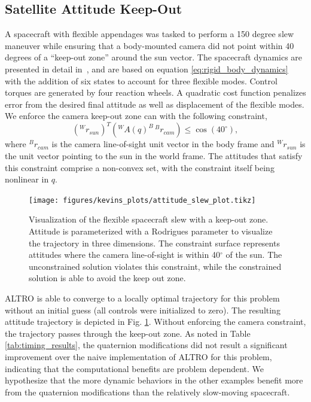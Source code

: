 \documentclass[letterpaper, 10 pt, conference]{ieeeconf}  %
\newcommand{\inframe}[2]{{}^{#1}\!#2}
\newcommand{\toframe}[3]{\inframe{#1}{#3}^{#2}}
\newcommand{\todo}[1]{\textcolor{red}{TODO: #1}}
\begin{document}
    \subsection{Satellite Attitude Keep-Out}
        A spacecraft with flexible appendages was tasked to perform a 150 degree slew maneuver while
        ensuring that a body-mounted camera did not point within 40 degrees of a  ``keep-out zone'' around the sun vector. The spacecraft dynamics are presented in detail in~\cite{Tracy2020}, and are based
        on equation \eqref{eq:rigid_body_dynamics} with the addition of six states to account for three flexible modes. Control torques are generated by four reaction wheels.  A quadratic cost function penalizes error from the desired final attitude as well as displacement of the flexible modes. 
        We enforce the camera keep-out zone can with the following constraint,
        \begin{equation}
            \left(\inframe{W}{r_{sun}}\right)^T 
            \left(\toframe{W}{B}{A(q)} \, \inframe{B}{r_{cam}} \right) \leq \cos(40 ^\circ) ,
        \end{equation}
        where $^Br_{cam}$ is the camera line-of-sight unit vector in the body frame and $^Wr_{sun}$ is the unit vector pointing to the sun in the world frame. The attitudes that satisfy this constraint comprise a non-convex set, with the constraint itself being nonlinear in $q$.
        \begin{figure}[ht]
            \centering
            \texttt{[image: figures/kevins\_plots/attitude\_slew\_plot.tikz]}
            \caption{Visualization of the flexible spacecraft slew with a keep-out zone. Attitude is parameterized with a Rodrigues parameter to visualize the trajectory in three dimensions. The constraint surface represents attitudes where the camera line-of-sight is within 40$^\circ$ of the sun. The unconstrained solution violates this constraint, while the constrained solution is able to avoid the keep out zone.}
            \label{fig:keepout}
        \end{figure}
        
        ALTRO is able to converge to a locally optimal trajectory for this problem without an initial guess (all controls were initialized to zero). The resulting attitude trajectory is depicted in Fig. \ref{fig:keepout}. Without enforcing the camera constraint, the trajectory passes through the keep-out zone. As noted in Table \ref{tab:timing_results}, the quaternion modifications did not result a significant improvement over the naive implementation of ALTRO for this problem, indicating that the computational benefits are problem dependent. We hypothesize that the more dynamic behaviors in the other examples benefit more from the quaternion modifications than the relatively slow-moving spacecraft.
    
\end{document}
